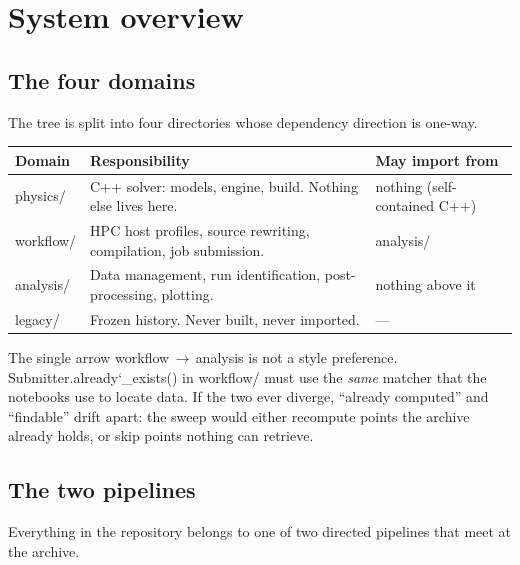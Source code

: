\documentclass[11pt,a4paper]{article}
\newcommand{\code}[1]{{\ttfamily #1}}
\newcommand{\brk}{\discretionary{}{}{}}
\newcommand{\uu}{\char`_\brk}
\newcommand{\fn}[1]{{\ttfamily #1}}
\begin{document}
\section{System overview}

\subsection{The four domains}

The tree is split into four directories whose dependency direction is one-way.

\begin{center}
\small
\begin{tabular}{@{}L{0.14\textwidth} L{0.44\textwidth} L{0.34\textwidth}@{}}
\toprule
\textbf{Domain} & \textbf{Responsibility} & \textbf{May import from} \\
\midrule
\code{physics/}  & C++ solver: models, engine, build. Nothing else lives here. & nothing (self-contained C++) \\
\code{workflow/} & HPC host profiles, source rewriting, compilation, job submission. & \code{analysis/} \\
\code{analysis/} & Data management, run identification, post-processing, plotting. & nothing above it \\
\code{legacy/}   & Frozen history. Never built, never imported. & --- \\
\bottomrule
\end{tabular}
\end{center}

\medskip
The single arrow \code{workflow}\,$\rightarrow$\,\code{analysis} is not a style
preference. \fn{Submitter.already\uu exists()} in \code{workflow/} must use the
\emph{same} matcher that the notebooks use to locate data. If the two ever
diverge, ``already computed'' and ``findable'' drift apart: the sweep would
either recompute points the archive already holds, or skip points nothing can
retrieve.

\subsection{The two pipelines}

Everything in the repository belongs to one of two directed pipelines that meet
at the archive.
\end{document}
